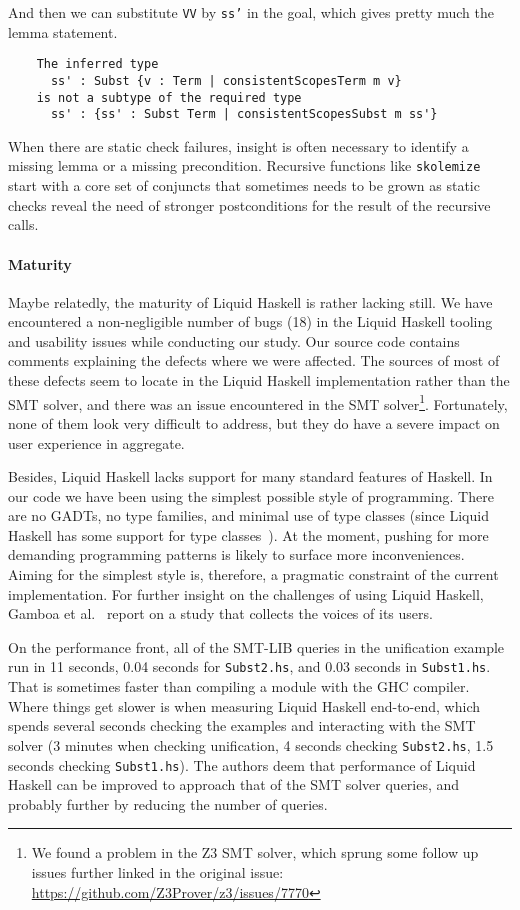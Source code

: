 \documentclass[sigconf]{acmart}
\newcommand{\tc}[1]{{\small\texttt{#1}}}
\begin{document}
And then we can substitute \tc{VV} by \tc{ss'} in the goal, which gives
pretty much the lemma statement.

\begin{verbatim}
    The inferred type
      ss' : Subst {v : Term | consistentScopesTerm m v}
    is not a subtype of the required type
      ss' : {ss' : Subst Term | consistentScopesSubst m ss'}
\end{verbatim}

When there are static check failures, insight is often necessary to identify
a missing lemma or a missing precondition.
Recursive functions like \tc{skolemize} start with a core
set of conjuncts that sometimes needs to be grown as static checks reveal the need of
stronger postconditions for the result of the recursive calls.

\paragraph{Maturity} Maybe relatedly, the maturity of Liquid
Haskell is rather lacking still. We have encountered a
non-negligible number of bugs (18) in the Liquid Haskell tooling and usability issues
while conducting our study. Our source code contains comments explaining the defects
where we were affected.
The sources of most of these defects seem to locate in the Liquid Haskell
implementation rather than the SMT solver, and there was an issue encountered in the SMT
solver\footnote{We found a problem in the Z3 SMT solver, which sprung some follow up issues
further linked in the original issue: \url{https://github.com/Z3Prover/z3/issues/7770}}.
Fortunately, none of them look very
difficult to address, but they do have a severe impact on user experience in aggregate.

Besides, Liquid Haskell lacks support for many standard features of Haskell.
In our code we have been using the simplest possible style of programming.
There are no GADTs, no type families, and minimal use of type classes (since
Liquid Haskell has some support for type classes~\cite{liu20}). At the moment,
pushing for more demanding programming patterns is likely to surface more
inconveniences. Aiming for the simplest style is, therefore, a pragmatic constraint of
the current implementation. For further insight on the challenges of using Liquid Haskell,
Gamboa et al.~\cite{gamboa25} report on a study that collects the voices
of its users.

On the performance front, all of the SMT-LIB queries in the unification example run
in 11 seconds, 0.04 seconds for \tc{Subst2.hs}, and 0.03 seconds in \tc{Subst1.hs}.
That is sometimes faster than compiling a module with the GHC compiler.
Where things get slower is when measuring Liquid
Haskell end-to-end, which spends several seconds checking the examples and interacting with the
SMT solver (3 minutes when checking unification, 4 seconds checking \tc{Subst2.hs},
1.5 seconds checking \tc{Subst1.hs}). The authors deem that performance of Liquid Haskell
can be improved to approach that of the SMT solver queries, and probably further by
reducing the number of queries.
\end{document}
